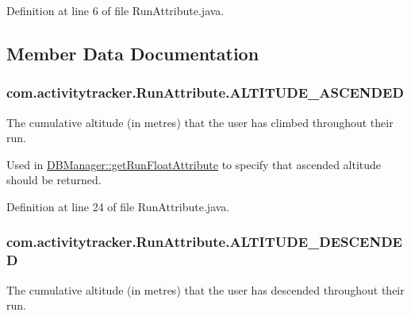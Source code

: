 Definition at line 6 of file Run\+Attribute.\+java.



\subsection{Member Data Documentation}
\subsubsection[{\texorpdfstring{A\+L\+T\+I\+T\+U\+D\+E\+\_\+\+A\+S\+C\+E\+N\+D\+ED}{ALTITUDE_ASCENDED}}]{\setlength{\rightskip}{0pt plus 5cm}com.\+activitytracker.\+Run\+Attribute.\+A\+L\+T\+I\+T\+U\+D\+E\+\_\+\+A\+S\+C\+E\+N\+D\+ED}\hypertarget{enumcom_1_1activitytracker_1_1_run_attribute_abcfe85bf48187d67842a0525c1bcc0af}{}\label{enumcom_1_1activitytracker_1_1_run_attribute_abcfe85bf48187d67842a0525c1bcc0af}
The cumulative altitude (in metres) that the user has climbed throughout their run.

Used in \hyperlink{classcom_1_1activitytracker_1_1_d_b_manager_a666452f1e5862f90c06b0beb9a9fcfdd}{D\+B\+Manager\+::get\+Run\+Float\+Attribute} to specify that ascended altitude should be returned. 

Definition at line 24 of file Run\+Attribute.\+java.

\subsubsection[{\texorpdfstring{A\+L\+T\+I\+T\+U\+D\+E\+\_\+\+D\+E\+S\+C\+E\+N\+D\+ED}{ALTITUDE_DESCENDED}}]{\setlength{\rightskip}{0pt plus 5cm}com.\+activitytracker.\+Run\+Attribute.\+A\+L\+T\+I\+T\+U\+D\+E\+\_\+\+D\+E\+S\+C\+E\+N\+D\+ED}\hypertarget{enumcom_1_1activitytracker_1_1_run_attribute_a337a68867cfdb8ec7a17c318ad8b216b}{}\label{enumcom_1_1activitytracker_1_1_run_attribute_a337a68867cfdb8ec7a17c318ad8b216b}
The cumulative altitude (in metres) that the user has descended throughout their run.

